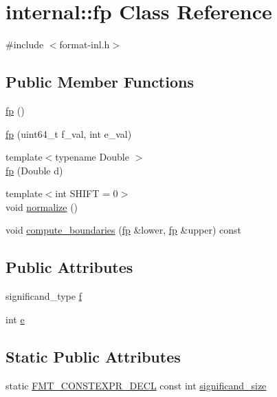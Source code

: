\hypertarget{classinternal_1_1fp}{}\section{internal\+:\+:fp Class Reference}
\label{classinternal_1_1fp}


{\ttfamily \#include $<$format-\/inl.\+h$>$}

\subsection*{Public Member Functions}
\begin{DoxyCompactItemize}
\item 
\hyperlink{classinternal_1_1fp_ac234ddc3b42b32b799a062feda3a56db}{fp} ()
\item 
\hyperlink{classinternal_1_1fp_a6697db0ca32b6662e0a87334e3400ac1}{fp} (uint64\+\_\+t f\+\_\+val, int e\+\_\+val)
\item 
{\footnotesize template$<$typename Double $>$ }\\\hyperlink{classinternal_1_1fp_a8829f486ec892cdd08e1f856facb5f9b}{fp} (Double d)
\item 
{\footnotesize template$<$int S\+H\+I\+FT = 0$>$ }\\void \hyperlink{classinternal_1_1fp_ac3c688f71ca6decf9a608680dda8ff23}{normalize} ()
\item 
void \hyperlink{classinternal_1_1fp_ab235dc2ba165fadc8342cf2be3365a77}{compute\+\_\+boundaries} (\hyperlink{classinternal_1_1fp}{fp} \&lower, \hyperlink{classinternal_1_1fp}{fp} \&upper) const
\end{DoxyCompactItemize}
\subsection*{Public Attributes}
\begin{DoxyCompactItemize}
\item 
significand\+\_\+type \hyperlink{classinternal_1_1fp_a7e1a8d0bebdf6d95582c035034484ab4}{f}
\item 
int \hyperlink{classinternal_1_1fp_aa68580ec0db366075ec0366dc7a74a34}{e}
\end{DoxyCompactItemize}
\subsection*{Static Public Attributes}
\begin{DoxyCompactItemize}
\item 
static \hyperlink{core_8h_af4388801466a5994a363d6005616371a}{F\+M\+T\+\_\+\+C\+O\+N\+S\+T\+E\+X\+P\+R\+\_\+\+D\+E\+CL} const int \hyperlink{classinternal_1_1fp_a226e27a91febae6a2d1d1501003be2f9}{significand\+\_\+size}
\end{DoxyCompactItemize}


